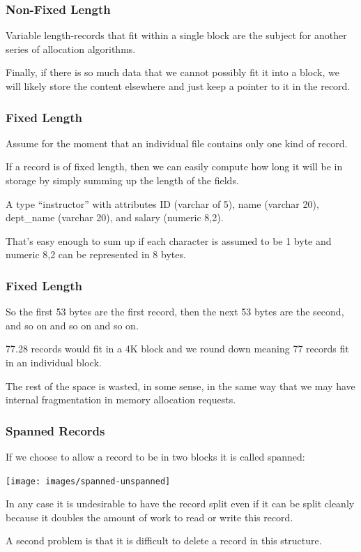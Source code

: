 \begin{frame}
\frametitle{Non-Fixed Length}


Variable length-records that fit within a single block are the subject for another series of allocation algorithms. 

Finally, if there is so much data that we cannot possibly fit it into a block, we will likely store the content elsewhere and just keep a pointer to it in the record.


\end{frame}



\begin{frame}
\frametitle{Fixed Length}

Assume for the moment that an individual file contains only one kind of record. 

If a record is of fixed length, then we can easily compute how long it will be in storage by simply summing up the length of the fields. 

A type ``instructor'' with attributes ID (varchar of 5), name (varchar 20), dept\_name (varchar 20), and salary (numeric 8,2).

That's easy enough to sum up if each character is assumed to be 1 byte and numeric 8,2 can be represented in 8 bytes.

\end{frame}



\begin{frame}
\frametitle{Fixed Length}
So the first 53 bytes are the first record, then the next 53 bytes are the second, and so on and so on and so on. 

77.28 records would fit in a 4K block and we round down meaning 77 records fit in an individual block. 

The rest of the space is wasted, in some sense, in the same way that we may have internal fragmentation in memory allocation requests.

\end{frame}



\begin{frame}
\frametitle{Spanned Records}

If we choose to allow a record to be in two blocks it is called \alert{spanned}:

\begin{center}
\texttt{[image: images/spanned-unspanned]}
\end{center}

In any case it is undesirable to have the record split even if it can be split cleanly because it doubles the amount of work to read or write this record.

A second problem is that it is difficult to delete a record in this structure.

\end{frame}




